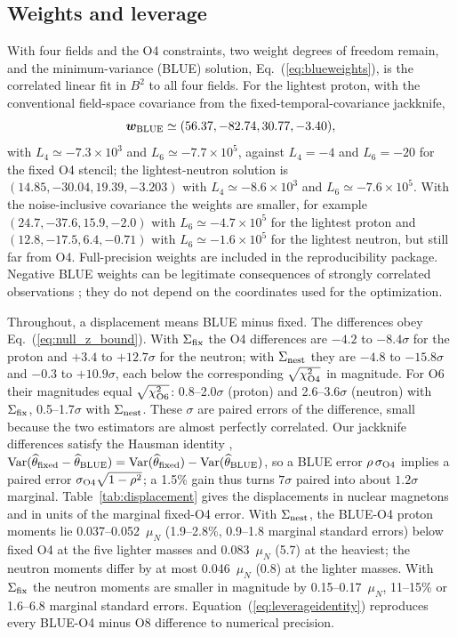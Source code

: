 \documentclass[aps,prd,preprint,nofootinbib,floatfix]{revtex4-2}
\begin{document}
\subsection{Weights and leverage}

With four fields and the O4 constraints, two weight degrees of freedom remain, and the minimum-variance (BLUE) solution, Eq.~(\ref{eq:blueweights}), is the correlated linear fit in $B^2$ to all four fields. For the lightest proton, with the conventional field-space covariance from the fixed-temporal-covariance jackknife,
\begin{equation}
\bm w_{\rm BLUE}\simeq(56.37,-82.74,30.77,-3.40),
\end{equation}
with $L_4\simeq-7.3\times10^3$ and $L_6\simeq-7.7\times10^5$, against $L_4=-4$ and $L_6=-20$ for the fixed O4 stencil; the lightest-neutron solution is $(14.85,-30.04,19.39,-3.203)$ with $L_4\simeq-8.6\times10^3$ and $L_6\simeq-7.6\times10^5$. With the noise-inclusive covariance the weights are smaller, for example $(24.7,-37.6,15.9,-2.0)$ with $L_6\simeq-4.7\times10^5$ for the lightest proton and $(12.8,-17.5,6.4,-0.71)$ with $L_6\simeq-1.6\times10^5$ for the lightest neutron, but still far from O4. Full-precision weights are included in the reproducibility package. Negative BLUE weights can be legitimate consequences of strongly correlated observations \cite{ValassiChierici2014}; they do not depend on the coordinates used for the optimization.

Throughout, a displacement means BLUE minus fixed. The differences obey Eq.~(\ref{eq:null_z_bound}). With $\Sigma_{\rm fix}$ the O4 differences are $-4.2$ to $-8.4\sigma$ for the proton and $+3.4$ to $+12.7\sigma$ for the neutron; with $\Sigma_{\rm nest}$ they are $-4.8$ to $-15.8\sigma$ and $-0.3$ to $+10.9\sigma$, each below the corresponding $\sqrt{\chi^2_{\rm O4}}$ in magnitude. For O6 their magnitudes equal $\sqrt{\chi^2_{\rm O6}}$: 0.8--2.0$\sigma$ (proton) and 2.6--3.6$\sigma$ (neutron) with $\Sigma_{\rm fix}$, 0.5--1.7$\sigma$ with $\Sigma_{\rm nest}$. These $\sigma$ are paired errors of the difference, small because the two estimators are almost perfectly correlated. Our jackknife differences satisfy the Hausman identity \cite{Hausman1978}, ${\rm Var}(\widehat\theta_{\rm fixed}-\widehat\theta_{\rm BLUE})={\rm Var}(\widehat\theta_{\rm fixed})-{\rm Var}(\widehat\theta_{\rm BLUE})$, so a BLUE error $\rho\,\sigma_{\rm O4}$ implies a paired error $\sigma_{\rm O4}\sqrt{1-\rho^2}$; a 1.5\% gain thus turns $7\sigma$ paired into about $1.2\sigma$ marginal. Table~\ref{tab:displacement} gives the displacements in nuclear magnetons and in units of the marginal fixed-O4 error. With $\Sigma_{\rm nest}$, the BLUE-O4 proton moments lie 0.037--0.052~$\mu_N$ (1.9--2.8\%, 0.9--1.8 marginal standard errors) below fixed O4 at the five lighter masses and 0.083~$\mu_N$ (5.7) at the heaviest; the neutron moments differ by at most 0.046~$\mu_N$ (0.8) at the lighter masses. With $\Sigma_{\rm fix}$ the neutron moments are smaller in magnitude by 0.15--0.17~$\mu_N$, 11--15\% or 1.6--6.8 marginal standard errors. Equation~(\ref{eq:leverageidentity}) reproduces every BLUE-O4 minus O8 difference to numerical precision.
\end{document}
